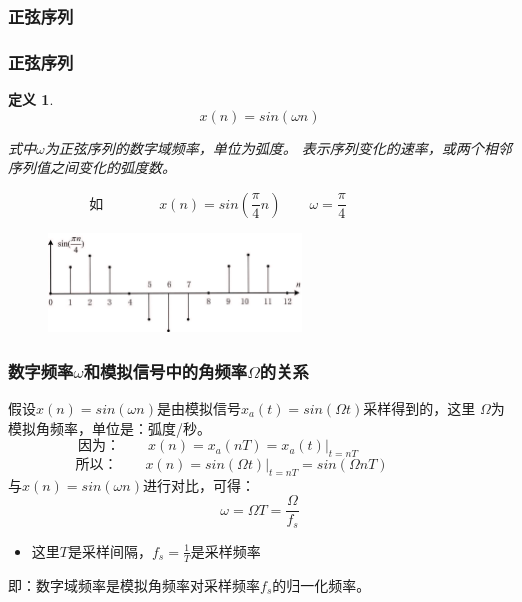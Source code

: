 \documentclass[notheorems,compress,mathserif,table]{beamer}
\newtheorem{definition}{定义}
\begin{document}
\subsubsection*{正弦序列}
\begin{frame}\frametitle{正弦序列}%
\begin{definition}
\begin{equation*}
    x(n) = sin(\omega n)
\end{equation*}

式中$\omega$为正弦序列的数字域频率，单位为弧度。
\emph{表示序列变化的速率，或两个相邻序列值之间变化的弧度数。}
\end{definition}
$$\mbox{如}\qquad\qquad x(n) = sin(\frac{\pi}{4}n)\qquad \omega = \frac{\pi}{4}\qquad\qquad\qquad$$

\begin{figure}[h]
  \centering
  \includegraphics[width=0.6\textwidth]{zhengxianxulie.jpg}\\
\end{figure}
\end{frame}


\begin{frame}[shrink]\frametitle{数字频率$\omega$和模拟信号中的角频率$\Omega$的关系}%

假设$x(n)=sin(\omega n)$是由模拟信号$x_{a}(t)= sin(\Omega t)$采样得到的，这里
$\Omega$为模拟角频率，单位是：弧度/秒。
$$\mbox{因为：}\qquad x(n) = x_{a}(nT) = x_{a}(t)|_{t=nT}\qquad\qquad\qquad$$
$$\mbox{所以：}\qquad x(n) =  sin(\Omega t)|_{t=nT} = sin(\Omega nT)\qquad\qquad$$
\quad\quad 与$x(n) = sin(\omega n)$进行对比，可得：
$$
    \omega = \Omega T = \frac{\Omega}{f_{s}}$$
\begin{itemize}
  \item 这里$T$是采样间隔，$f_{s} =\frac{1}{T}$是采样频率
\end{itemize}

即：数字域频率是模拟角频率对采样频率$f_{s}$的归一化频率。
\end{frame}
\end{document}
